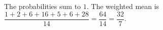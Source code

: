 The probabilities sum to $1$. The weighted mean is $\dfrac{1+2+6+16+5+6+28}{14}=\dfrac{64}{14}=\boxed{\dfrac{32}{7}}$.

